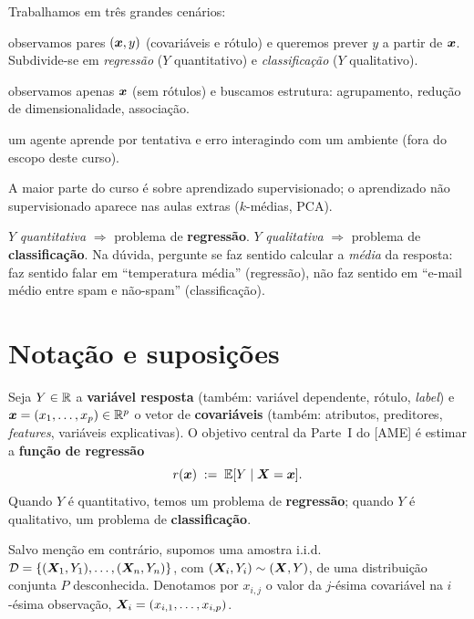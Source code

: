 \documentclass[11pt,a4paper]{article}
\begin{document}
Trabalhamos em três grandes cenários:
\begin{description}[leftmargin=2.6cm,style=nextline]
  \item[Supervisionado] observamos pares $(\bm{x},y)$ (covariáveis e rótulo) e
        queremos prever $y$ a partir de $\bm{x}$. Subdivide-se em \emph{regressão}
        ($Y$ quantitativo) e \emph{classificação} ($Y$ qualitativo).
  \item[Não supervisionado] observamos apenas $\bm{x}$ (sem rótulos) e buscamos
        estrutura: agrupamento, redução de dimensionalidade, associação.
  \item[Por reforço] um agente aprende por tentativa e erro interagindo com um
        ambiente (fora do escopo deste curso).
\end{description}
A maior parte do curso é sobre aprendizado supervisionado; o aprendizado não
supervisionado aparece nas aulas extras ($k$-médias, PCA).

\begin{atencao}
$Y$ \emph{quantitativa} $\Rightarrow$ problema de \textbf{regressão}.
$Y$ \emph{qualitativa} $\Rightarrow$ problema de \textbf{classificação}.
Na dúvida, pergunte se faz sentido calcular a \emph{média} da resposta: faz sentido
falar em ``temperatura média'' (regressão), não faz sentido em ``e-mail médio entre
spam e não-spam'' (classificação).
\end{atencao}

\section{Notação e suposições}
Seja $Y\in\mathbb{R}$ a \textbf{variável resposta} (também: variável dependente, rótulo,
\emph{label}) e $\bm{x}=(x_1,\dots,x_p)\in\mathbb{R}^p$ o vetor de \textbf{covariáveis}
(também: atributos, preditores, \emph{features}, variáveis explicativas). O
objetivo central da Parte~I do [AME] é estimar a \textbf{função de regressão}
\begin{equation}\label{eq:r}
  r(\bm{x}) \;:=\; \mathbb{E}[Y\mid \bm{X}=\bm{x}].
\end{equation}
Quando $Y$ é quantitativo, temos um problema de \textbf{regressão}; quando $Y$ é
qualitativo, um problema de \textbf{classificação}.

\begin{definicao}
Salvo menção em contrário, supomos uma amostra i.i.d.
$\mathcal{D}=\{(\bm{X}_1,Y_1),\dots,(\bm{X}_n,Y_n)\}$, com $(\bm{X}_i,Y_i)\sim (\bm{X},Y)$, de uma
distribuição conjunta $P$ desconhecida. Denotamos por $x_{i,j}$ o valor da
$j$-ésima covariável na $i$-ésima observação, $\bm{X}_i=(x_{i,1},\dots,x_{i,p})$.
\end{definicao}
\end{document}
